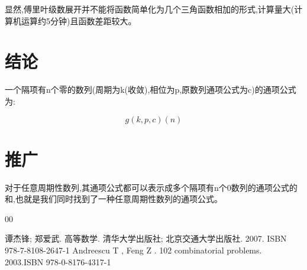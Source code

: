 \documentclass[final,3p,times,onecolumn]{elsarticle}
\begin{document}
显然,傅里叶级数展开并不能将函数简单化为几个三角函数相加的形式,计算量大(计算机运算约5分钟)且函数差距较大。

\section{结论}

一个隔项有n个零的数列(周期为k(收敛),相位为p,原数列通项公式为c)的通项公式为:

$$g(k,p,c)(n)$$

\section{推广}

对于任意周期性数列,其通项公式都可以表示成多个隔项有n个0数列的通项公式的和,也就是我们同时找到了一种任意周期性数列的通项公式。





\begin{thebibliography}{00}


 谭杰锋; 郑爱武. 高等数学. 清华大学出版社; 北京交通大学出版社. 2007. ISBN 978-7-8108-2647-1
 Andreescu T ,  Feng Z . 102 combinatorial problems. 2003.ISBN 978-0-8176-4317-1

\end{thebibliography}
\end{document}
